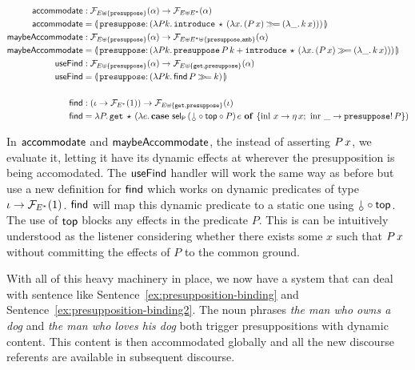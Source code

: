\begin{align*}
  \accommodate &: \FF_{E \uplus \{\op{presuppose}\}}(\alpha) \to \FF_{E \uplus E^*}(\alpha) \\
  \accommodate &= \banana{\onto{\op{presuppose}}{(\lam{P k}{
    \app{\op{introduce}}{\star}{(\lam{x}{(\ap{P}{x}) \hsbind (\lam{\_}{\ap{k}{x}})})}})}} \\
  \maybeAccommodate &: \FF_{E \uplus \{\op{presuppose}\}}(\alpha) \to
                      \FF_{E \uplus E^* \uplus \{\op{presuppose},\op{amb}\}}(\alpha) \\
  \maybeAccommodate &= \banana{\onto{\op{presuppose}}{(\lam{P k}{
    \app{\op{presuppose}}{P}{k} +
    \app{\op{introduce}}{\star}{(\lam{x}{(\ap{P}{x}) \hsbind (\lam{\_}{\ap{k}{x}})})}})}} \\
  \useFind &: \FF_{E \uplus \{\op{presuppose}\}}(\alpha) \to \FF_{E \uplus \{\op{get}, \op{presuppose}\}}(\alpha) \\
  \useFind &= \banana{\onto{\op{presuppose}}{(\lam{P k}{\ap{\find}{P} \hsbind k})}} \\
  \\
  \find &: (\iota \to \FF_{E^*}(1)) \to \FF_{E \uplus \{\op{get}, \op{presuppose}\}}(\iota) \\
  \find &= \lam{P}{\app{\op{get}}{\star}{(\lam{e}{\case{\app{\selP}{(\cherry \circ \TOP \circ P)}{e}}{x}{\etaE{x}}{\_}{\ap{\op{presuppose}!}{P}}})}}
\end{align*}

In $\textsf{accommodate}$ and $\textsf{maybeAccommodate}$, the instead of asserting
$P\,x$, we evaluate it, letting it have its dynamic effects at
wherever the presupposition is being accomodated. The $\textsf{useFind}$ handler
will work the same way as before but use a new definition for $\textsf{find}$ which
works on dynamic predicates of type $\iota \to \mathcal{F}_{E^*}(1)$. $\textsf{find}$ will
map this dynamic predicate to a static one using $\cherry \circ \TOP$. The
use of $\textsf{top}$ blocks any effects in the predicate $P$. This is can be
intuitively understood as the listener considering whether there exists
some $x$ such that $P\,x$ without committing the effects of $P$ to the
common ground.

With all of this heavy machinery in place, we now have a system that can
deal with sentence like Sentence~\ref{ex:presupposition-binding} and
Sentence~\ref{ex:presupposition-binding2}. The noun phrases \emph{the man
  who owns a dog} and \emph{the man who loves his dog} both trigger
presuppositions with dynamic content. This content is then accommodated
globally and all the new discourse referents are available in subsequent
discourse.

